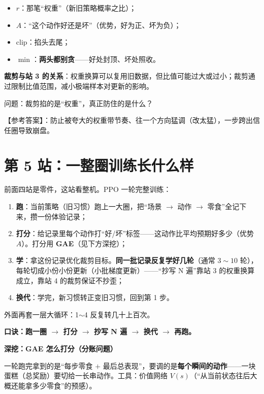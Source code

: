 \documentclass[UTF8,12pt,a4paper]{ctexrep}
\newcommand{\pin}[1]{\begin{pinbox}#1\end{pinbox}}
\newcommand{\selfcheck}[1]{\begin{checkb}#1\end{checkb}}
\begin{document}
\begin{itemize}[nosep]
  \item $r$：那笔``权重''（新旧策略概率之比）；
  \item $A$：``这个动作好还是坏''（优势，好为正、坏为负）；
  \item $\mathrm{clip}$：掐头去尾；
  \item $\min$：\textbf{两头都别贪}——好处封顶、坏处照收。
\end{itemize}

\textbf{裁剪与站 3 的关系}：权重换算可以复用旧数据，但比值可能过大或过小；裁剪通过限制比值范围，减小极端样本对更新的影响。

\selfcheck{问题：裁剪掐的是``权重''，真正防住的是什么？

【参考答案】：防止被夸大的权重带节奏、往一个方向猛调（改太猛），一步跨出信任圈导致崩盘。}

\section{第 5 站：一整圈训练长什么样}

前面四站是零件，这站看整机。PPO 一轮完整训练：

\begin{enumerate}[nosep]
  \item \textbf{跑}：当前策略（旧习惯）跑上一大圈，把``场景 $\to$ 动作 $\to$ 零食''全记下来，攒一份体验记录；
  \item \textbf{打分}：给记录里每个动作打``好/坏''标签——这动作比平均预期好多少（优势 $A$）。打分用 \textbf{GAE}（见下方深挖）；
  \item \textbf{学}：拿这份记录优化裁剪目标。\textbf{同一批记录反复学好几轮}（通常 $3\sim10$ 轮），每轮切成小份小份更新（小批梯度更新）——``抄写 N 遍''靠站 3 的权重换算成立，靠站 4 的裁剪保证不抄歪；
  \item \textbf{换代}：学完，新习惯转正变旧习惯，回到第 1 步。
\end{enumerate}

外面再套一层大循环：1$\sim$4 反复转几十上百次。

\pin{\textbf{口诀：跑一圈 $\to$ 打分 $\to$ 抄写 N 遍 $\to$ 换代 $\to$ 再跑。}}
\vspace{3mm}
\noindent\textbf{深挖：GAE 怎么打分（分账问题）}

一轮跑完拿到的是``每步零食 $+$ 最后总表现''，要调的是\textbf{每个瞬间的动作}——一块蛋糕（总奖励）要切给一长串动作。工具：价值网络 $V(s)$（``从当前状态往后大概还能拿多少零食''的预感）。
\end{document}
